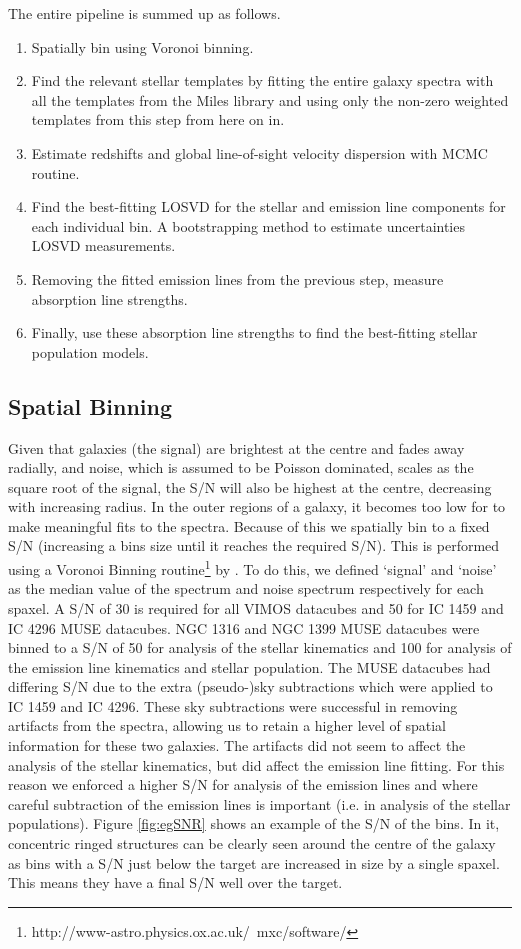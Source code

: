 	The entire pipeline is summed up as follows.
	\begin{enumerate}
		\item Spatially bin using Voronoi binning.
		\item Find the relevant stellar templates by fitting the entire galaxy spectra with all the templates from the Miles library and using only the non-zero weighted templates from this step from here on in.
		\item Estimate redshifts and global line-of-sight velocity dispersion with MCMC routine. 
		\item Find the best-fitting LOSVD for the stellar and emission line components for each individual bin. A bootstrapping method to estimate uncertainties LOSVD measurements. 
		\item Removing the fitted emission lines from the previous step, measure absorption line strengths. 
		\item Finally, use these absorption line strengths to find the best-fitting stellar population models.
	\end{enumerate}


	\subsection{Spatial Binning}
		\label{subsec:Binning}
		Given that galaxies (the signal) are brightest at the centre and fades away radially, and noise, which is assumed to be Poisson dominated, scales as the square root of the signal, the S/N will also be highest at the centre, decreasing with increasing radius. In the outer regions of a galaxy, it becomes too low for to make meaningful fits to the spectra. Because of this we spatially bin to a fixed S/N (increasing a bins size until it reaches the required S/N). This is performed using a Voronoi Binning routine\footnote{http://www-astro.physics.ox.ac.uk/~mxc/software/} by \citet{Cappellari2003}. To do this, we defined `signal' and `noise' as the median value of the spectrum and noise spectrum respectively for each spaxel. A S/N of 30 is required for all VIMOS datacubes and 50 for IC 1459 and IC 4296 MUSE datacubes. NGC 1316 and NGC 1399 MUSE datacubes were binned to a S/N of 50 for analysis of the stellar kinematics and 100 for analysis of the emission line kinematics and stellar population. The MUSE datacubes had differing S/N due to the extra (pseudo-)sky subtractions which were applied to IC 1459 and IC 4296. These sky subtractions were successful in removing artifacts from the spectra, allowing us to retain a higher level of spatial information for these two galaxies. The artifacts did not seem to affect the analysis of the stellar kinematics, but did affect the emission line fitting. For this reason we enforced a higher S/N for analysis of the emission lines and where careful subtraction of the emission lines is important (i.e. in analysis of the stellar populations). Figure \ref{fig:egSNR} shows an example of the S/N of the bins. In it, concentric ringed structures can be clearly seen around the centre of the galaxy as bins with a S/N just below the target are increased in size by a single spaxel. This means they have a final S/N well over the target.

